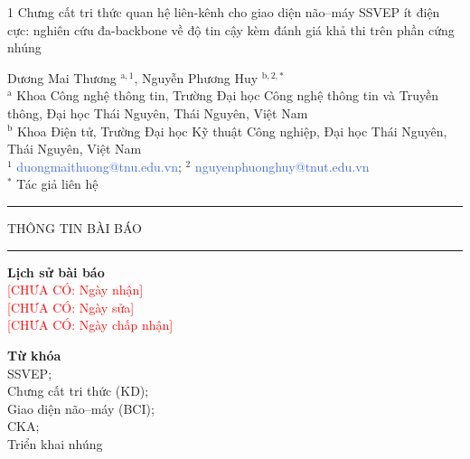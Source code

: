 \documentclass[11pt,a4paper,twoside,asymmetric]{article}
\newcommand{\tbd}[1]{\textcolor{red}{[CHƯA CÓ: #1]}}
\begin{document}
\begin{flushleft}
{\LARGE{
\begin{spacing}{1}
Chưng cất tri thức quan hệ liên-kênh cho giao diện não--máy SSVEP ít điện cực: nghiên cứu đa-backbone về độ tin cậy kèm đánh giá khả thi trên phần cứng nhúng
\end{spacing}
}}
\vspace{1em}
Dương Mai Thương $^{\text{a},1}$, Nguyễn Phương Huy $^{\text{b},2,\ast}$\\
\vspace{.5em}
\footnotesize{$^\text{a}$ Khoa Công nghệ thông tin, Trường Đại học Công nghệ thông tin và Truyền thông, Đại học Thái Nguyên, Thái Nguyên, Việt Nam\\
$^\text{b}$ Khoa Điện tử, Trường Đại học Kỹ thuật Công nghiệp, Đại học Thái Nguyên, Thái Nguyên, Việt Nam\\
$^1$ \textcolor{RoyalBlue}{duongmaithuong@tnu.edu.vn}; $^2$ \textcolor{RoyalBlue}{nguyenphuonghuy@tnut.edu.vn}\\
$^\ast$ Tác giả liên hệ}
\end{flushleft}
{\color{RoyalBlue} \rule{\linewidth}{0.4mm}}
\vspace{.5em}
\noindent
\parbox[t][][s]{0.26\textwidth}{THÔNG TIN BÀI BÁO
\vspace{.5em}

{\color{RoyalBlue}\rule{\linewidth}{0.4mm}}

\vspace{1em}
\footnotesize{\textbf{Lịch sử bài báo}\\
\tbd{Ngày nhận}\\
\tbd{Ngày sửa}\\
\tbd{Ngày chấp nhận}\\
}

\vspace{1em}
\small{\footnotesize{\textbf{Từ khóa}\\
SSVEP;\\
Chưng cất tri thức (KD);\\
Giao diện não--máy (BCI);\\
CKA;\\
Triển khai nhúng}
}
\vspace{.5em}
\vspace{\fill}
}
\parbox{0.025\textwidth}{\hspace{0.5em}}
\end{document}
